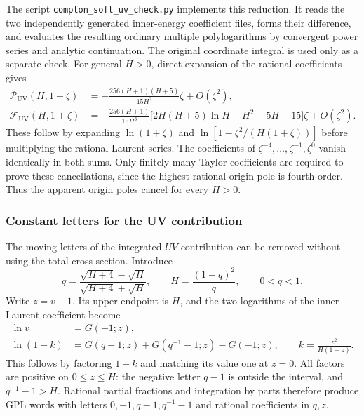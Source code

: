 The script \texttt{compton\_soft\_uv\_check.py} implements this reduction.
It reads the two independently generated inner-energy coefficient files,
forms their difference, and evaluates the resulting ordinary multiple
polylogarithms by convergent power series and analytic continuation.
The original coordinate integral is used only as a separate check.
For general $H>0$, direct expansion of the rational coefficients gives
\begin{align}
 \mathcal P_{\mathrm{UV}}(H,1+\zeta)
 &=-\frac{256(H+1)(H+5)}{15H^2}\zeta+O(\zeta^2),\\
 \mathcal F_{\mathrm{UV}}(H,1+\zeta)
 &=-\frac{256(H+1)}{15H^3}
 \bigl[2H(H+5)\ln H-H^2-5H-15\bigr]\zeta
 +O(\zeta^2).
\end{align}
These follow by expanding $\ln(1+\zeta)$ and
$\ln[1-\zeta^2/(H(1+\zeta))]$ before multiplying the rational Laurent
series. The coefficients of $\zeta^{-4},\ldots,\zeta^{-1},\zeta^0$
vanish identically in both sums. Only finitely many Taylor coefficients
are required to prove these cancellations, since the highest rational
origin pole is fourth order.
Thus the apparent origin poles cancel for every $H>0$.
\subsubsection{Constant letters for the UV contribution}
The moving letters of the integrated $UV$ contribution can be removed
without using the total cross section.  Introduce
\begin{equation}
 q=\frac{\sqrt{H+4}-\sqrt H}{\sqrt{H+4}+\sqrt H},\qquad
 H=\frac{(1-q)^2}{q},\qquad 0<q<1.
\end{equation}
Write $z=v-1$.  Its upper endpoint is $H$, and the two logarithms of the
inner Laurent coefficient become
\begin{align}
 \ln v&=G(-1;z),\\
 \ln(1-k)&=G(q-1;z)+G(q^{-1}-1;z)-G(-1;z),
 \qquad k=\frac{z^2}{H(1+z)}.
\end{align}
This follows by factoring $1-k$ and matching its value one at $z=0$.
All factors are positive on $0\leq z\leq H$: the negative letter $q-1$
is outside the interval, and $q^{-1}-1>H$.  Rational partial fractions
and integration by parts therefore produce GPL words with letters
$0,-1,q-1,q^{-1}-1$ and rational coefficients in $q,z$.

